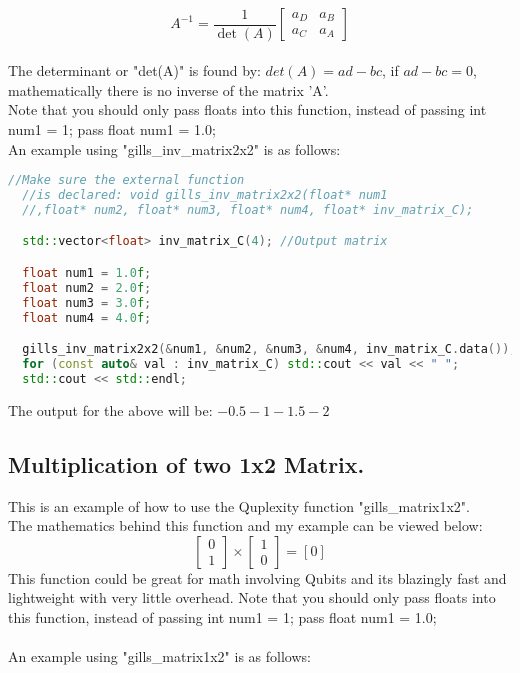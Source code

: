 \documentclass{article}
\begin{document}
\[
A^{-1} = \frac{1}{\det(A)} \begin{bmatrix}
a_{D} & a_{B} \\
a_{C} & a_{A}
\end{bmatrix}
\] \\

\noindent The determinant or "det(A)" is found by: $det(A) = ad - bc$, if $ad - bc = 0$, mathematically there is no inverse of the matrix 'A'. \\
Note that you should only pass floats into this function, instead of passing int num1 = 1; pass float num1 = 1.0; \\
An example using "gills\_inv\_matrix2x2" is as follows:

\begin{lstlisting}[language=C++, frame=single]
  //Make sure the external function 
  //is declared: void gills_inv_matrix2x2(float* num1
  //,float* num2, float* num3, float* num4, float* inv_matrix_C);

  std::vector<float> inv_matrix_C(4); //Output matrix

  float num1 = 1.0f;
  float num2 = 2.0f;
  float num3 = 3.0f;
  float num4 = 4.0f;

  gills_inv_matrix2x2(&num1, &num2, &num3, &num4, inv_matrix_C.data());
  for (const auto& val : inv_matrix_C) std::cout << val << " ";
  std::cout << std::endl;
\end{lstlisting}

\noindent The output for the above will be: $-0.5 -1 -1.5 -2$ \\

\subsection*{Multiplication of two 1x2 Matrix.}
This is an example of how to use the Quplexity function "gills\_matrix1x2". \\
The mathematics behind this function and my example can be viewed below: \\

\[
\begin{bmatrix}
0 \\
1
\end{bmatrix}
\times
\begin{bmatrix}
1 \\
0
\end{bmatrix}
= [0]
\]
\noindent This function could be great for math involving Qubits and its blazingly fast and lightweight with very little overhead.
Note that you should only pass floats into this function, instead of passing int num1 = 1; pass float num1 = 1.0; \\\\
An example using "gills\_matrix1x2" is as follows:
\end{document}
